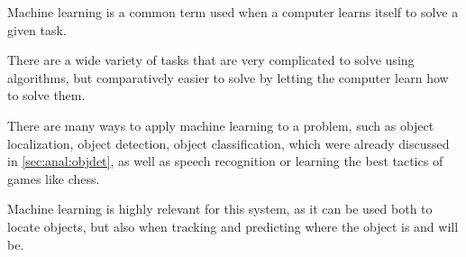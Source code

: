 Machine learning is a common term used when a computer learns itself to solve a given task\cite{ArtificialIntelligencealanpoole}.

There are a wide variety of tasks that are very complicated to solve using algorithms, but comparatively easier to solve by letting the computer learn how to solve them.

There are many ways to apply machine learning to a problem, such as object localization, object detection, object classification, which were already discussed in \autoref{sec:anal:objdet}, as well as speech recognition or learning the best tactics of games like chess.

Machine learning is highly relevant for this system, as it can be used both to locate objects, but also when tracking and predicting where the object is and will be.
